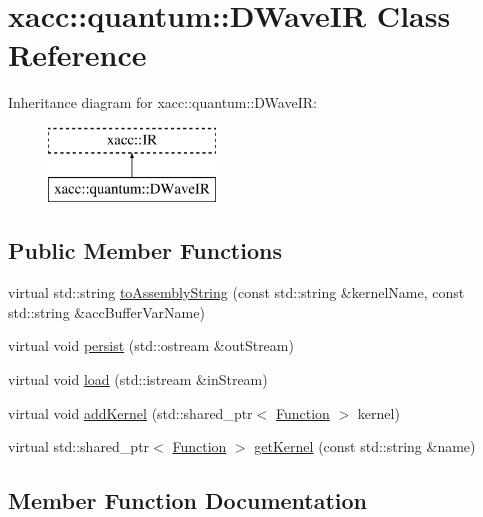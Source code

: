 \hypertarget{a01268}{}\section{xacc\+:\+:quantum\+:\+:D\+Wave\+IR Class Reference}
\label{a01268}
Inheritance diagram for xacc\+:\+:quantum\+:\+:D\+Wave\+IR\+:\begin{figure}[H]
\begin{center}
\leavevmode
\includegraphics[height=2.000000cm]{a01268}
\end{center}
\end{figure}
\subsection*{Public Member Functions}
\begin{DoxyCompactItemize}
\item 
virtual std\+::string \hyperlink{a01268_ac19ad098d5bbfe769809c10e26ebebc6}{to\+Assembly\+String} (const std\+::string \&kernel\+Name, const std\+::string \&acc\+Buffer\+Var\+Name)
\item 
virtual void \hyperlink{a01268_adac268c6fa2234902efeb9b3c07c0ac2}{persist} (std\+::ostream \&out\+Stream)
\item 
virtual void \hyperlink{a01268_a94d814172ec30c7ed32e6ab52bc2a41a}{load} (std\+::istream \&in\+Stream)
\item 
virtual void \hyperlink{a01268_a7e1ddff2771233dc45f60a6b7e15ef63}{add\+Kernel} (std\+::shared\+\_\+ptr$<$ \hyperlink{a02456}{Function} $>$ kernel)
\item 
virtual std\+::shared\+\_\+ptr$<$ \hyperlink{a02456}{Function} $>$ \hyperlink{a01268_ac4295dfef98c94d7154a4fd39a6e5d1c}{get\+Kernel} (const std\+::string \&name)
\end{DoxyCompactItemize}


\subsection{Member Function Documentation}
\mbox{\label{a01268_a7e1ddff2771233dc45f60a6b7e15ef63}} 
